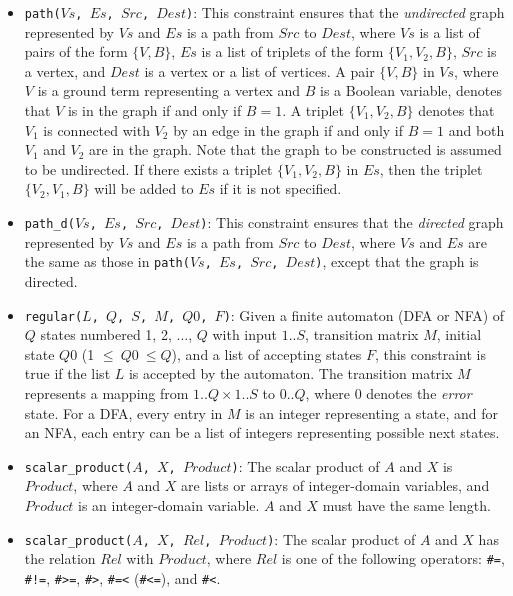 \begin{itemize}
\item \texttt{path($Vs$, $Es$, $Src$, $Dest$)}: This constraint ensures that the \textit{undirected} graph represented by $Vs$ and $Es$ is a path from $Src$ to $Dest$, where $Vs$ is a list of pairs of the form $\{V,B\}$, $Es$ is a list of triplets of the form $\{V_1,V_2,B\}$, $Src$ is a vertex, and $Dest$ is a vertex or a list of vertices. A pair $\{V,B\}$ in $Vs$, where $V$ is a ground term representing a vertex and $B$ is a Boolean variable, denotes that $V$ is in the graph if and only if $B = 1$. A triplet $\{V_1,V_2,B\}$ denotes that $V_1$ is connected with $V_2$  by an edge in the graph if and only if $B = 1$ and both $V_1$ and $V_2$ are in the graph. Note that the graph to be constructed is assumed to be undirected. If there exists a triplet $\{V_1,V_2,B\}$ in $Es$, then the triplet $\{V_2,V_1,B\}$ will be added to $Es$ if it is not specified.

\item \texttt{path\_d($Vs$, $Es$, $Src$, $Dest$)}: This constraint ensures that the \textit{directed} graph represented by $Vs$ and $Es$ is a path from $Src$ to $Dest$, where $Vs$ and $Es$ are the same as those in \texttt{path($Vs$, $Es$, $Src$, $Dest$)}, except that the graph is directed.

\item \texttt{regular($L$, $Q$, $S$, $M$, $Q0$, $F$)}:  Given a finite automaton (DFA or NFA) of $Q$ states numbered 1, 2, $\ldots$, $Q$ with input $1..S$, transition matrix $M$, initial state $Q0$ (1 $\le\ Q0\ \le Q$), and a list of accepting states $F$, this constraint is true if the list $L$ is accepted by the automaton. The transition matrix $M$ represents a mapping from $1..Q\times 1..S$ to $0..Q$, where $0$ denotes the {\it error} state.  For a DFA, every entry in $M$ is an integer representing a state, and for an NFA, each entry can be a list of integers representing possible next states.

\item \texttt{scalar\_product($A$, $X$, $Product$)}: The scalar product of $A$ and $X$ is $Product$, where $A$ and $X$ are lists or arrays of integer-domain variables, and $Product$ is an integer-domain variable. $A$ and $X$ must have the same length.

\item \texttt{scalar\_product($A$, $X$, $Rel$, $Product$)}: The scalar product of $A$ and $X$ has the relation $Rel$ with $Product$, where $Rel$ is one of the following operators: \verb+#=+, \verb+#!=+, \verb+#>=+, \verb+#>+, \verb+#=<+ (\verb+#<=+), and \verb+#<+. 


\end{itemize}
